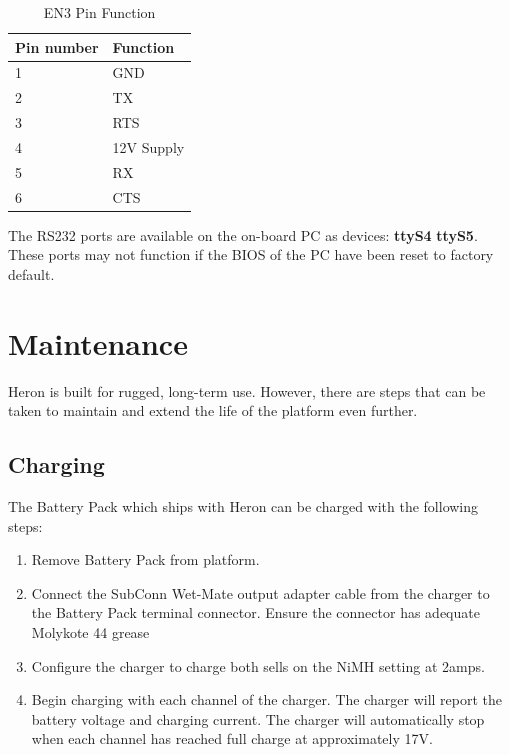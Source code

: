 \documentclass[]{clearpath-latex/clearpath-manual}
\begin{document}
\begin{table}[h]
\centering
\label{chg_pinout}
\begin{tabular}{|l|l|} 
Pin number  & Function \\
\hline
1  & GND              \\ \hline
2  & TX  \\ \hline
3  & RTS  \\ \hline
4  & 12V Supply            \\ \hline
5  & RX             \\ \hline
6  & CTS            \\ \hline

\end{tabular}
\caption{EN3 Pin Function}
\end{table}

The RS232 ports are available on the on-board PC as devices: \textbf{ttyS4} \textbf{ttyS5}. These ports may not function if the BIOS of the PC have been reset to factory default. 

\newpage

\section{Maintenance}
Heron is built for rugged, long-term use. However, there are steps that can be taken to maintain and extend the life of the platform even further.

\subsection{Charging}
The Battery Pack which ships with Heron can be charged with the following steps:

\begin{enumerate}[nolistsep]
	\item Remove Battery Pack from platform.
	\item Connect the SubConn Wet-Mate output adapter cable from the charger to the Battery Pack terminal connector. Ensure the connector has adequate Molykote 44 grease
	\item Configure the charger to charge both sells on the NiMH setting at 2amps. 
	\item Begin charging with each channel of the charger. The charger will report the battery voltage and charging current. The charger will automatically stop when each channel has reached full charge at approximately 17V. 
\end{enumerate}
\end{document}
